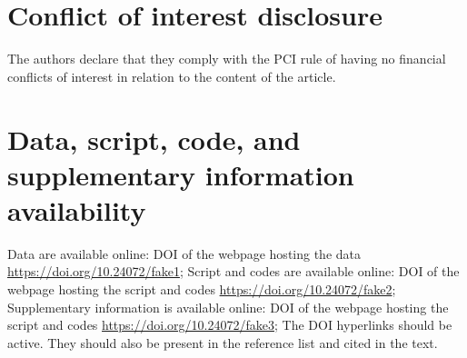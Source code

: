 \documentclass[PCJ,Unicode,screen,mode=plain]{cedram}
\begin{document}
\section*{Conflict of interest disclosure}

The authors declare that they comply with the PCI rule of having no financial
conflicts of interest in relation to the content of the article.

\section*{Data, script, code, and supplementary information availability}

Data are available online: DOI of the webpage hosting the data \url{https://doi.org/10.24072/fake1};
Script and codes are available online: DOI of the webpage hosting the script and codes \url{https://doi.org/10.24072/fake2};
Supplementary information is available online: DOI of the webpage hosting the script and codes \url{https://doi.org/10.24072/fake3};
The DOI hyperlinks should be active. They should also be present in the reference list and cited in the text.

\printbibliography
\end{document}
